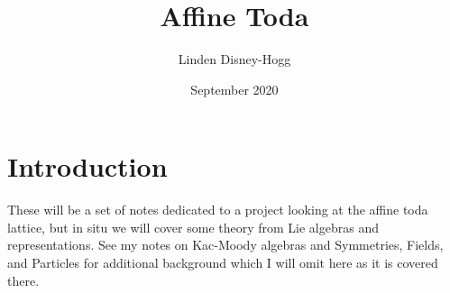 \documentclass{article}
\title{Affine Toda}
\author{Linden Disney-Hogg}
\date{September 2020}
\begin{document}
\maketitle
\tableofcontents

\section{Introduction}
These will be a set of notes dedicated to a project looking at the affine toda lattice, but in situ we will cover some theory from Lie algebras and representations. See my notes on Kac-Moody algebras and Symmetries, Fields, and Particles for additional background which I will omit here as it is covered there. 
\end{document}
